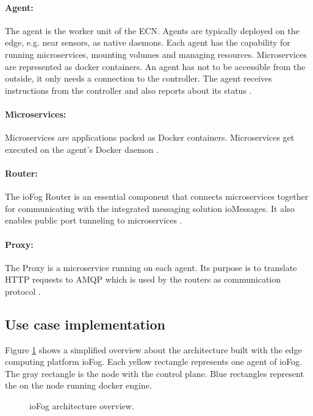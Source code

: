 \paragraph{Agent:} The agent is the worker unit of the \gls{ECN}. Agents are typically deployed on the edge, e.g. near sensors, as native daemons. Each agent has the capability for running microservices, mounting volumes and managing resources. Microservices are represented as docker containers. An agent has not to be accessible from the outside, it only needs a connection to the controller. The agent receives instructions from the controller and also reports about its status \cite{ioFogArchitecture}.

\paragraph{Microservices:} Microservices are applications packed as Docker containers. Microservices get executed on the agent's Docker daemon \cite{ioFogArchitecture}.

\paragraph{Router:} The ioFog Router is an essential component that connects microservices together for communicating with the integrated messaging solution ioMessages. It also enables public port tunneling to microservices \cite{ioFogArchitecture}.

\paragraph{Proxy:} The Proxy is a microservice running on each agent. Its purpose is to translate HTTP requests to AMQP which is used by the routers as communication protocol \cite{ioFogArchitecture}.


\subsection{Use case implementation}
Figure \ref{fig:ioFog-arch} shows a simplified overview about the architecture built with the edge computing platform ioFog. Each yellow rectangle represents one agent of ioFog. The gray rectangle is the node with the control plane. Blue rectangles represent the on the node running docker engine.

\begin{figure}[H]
    \fontsize{6}{10}\selectfont
    \centering
    \def\svgwidth{\textwidth}
    
    \caption{ioFog architecture overview.}\label{fig:ioFog-arch}
\end{figure}


